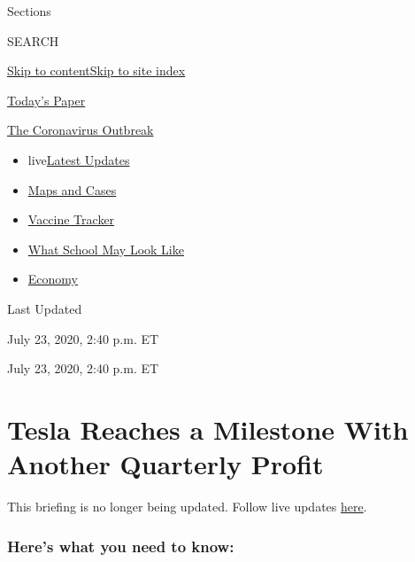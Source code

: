 Sections

SEARCH

\protect\hyperlink{site-content}{Skip to
content}\protect\hyperlink{site-index}{Skip to site index}

\href{https://myaccount.nytimes.com/auth/login?response_type=cookie\&client_id=vi}{}

\href{https://www.nytimes.com/section/todayspaper}{Today's Paper}

\href{https://www.nytimes.com/news-event/coronavirus}{The Coronavirus
Outbreak}

\begin{itemize}
\tightlist
\item
  live\href{https://www.nytimes.com/2020/08/01/world/coronavirus-covid-19.html}{Latest
  Updates}
\item
  \href{https://www.nytimes.com/interactive/2020/us/coronavirus-us-cases.html}{Maps
  and Cases}
\item
  \href{https://www.nytimes.com/interactive/2020/science/coronavirus-vaccine-tracker.html}{Vaccine
  Tracker}
\item
  \href{https://www.nytimes.com/interactive/2020/07/29/us/schools-reopening-coronavirus.html}{What
  School May Look Like}
\item
  \href{https://www.nytimes.com/live/2020/07/31/business/stock-market-today-coronavirus}{Economy}
\end{itemize}

Last Updated

July 23, 2020, 2:40 p.m. ET

July 23, 2020, 2:40 p.m. ET

\hypertarget{tesla-reaches-a-milestone-with-another-quarterly-profit}{%
\section{Tesla Reaches a Milestone With Another Quarterly
Profit}\label{tesla-reaches-a-milestone-with-another-quarterly-profit}}

This briefing is no longer being updated. Follow live updates
\href{https://www.nytimes.com/live/2020/07/23/business/stock-market-today-coronavirus}{here}.

\hypertarget{heres-what-you-need-to-know}{%
\subsubsection{Here's what you need to
know:}\label{heres-what-you-need-to-know}}

